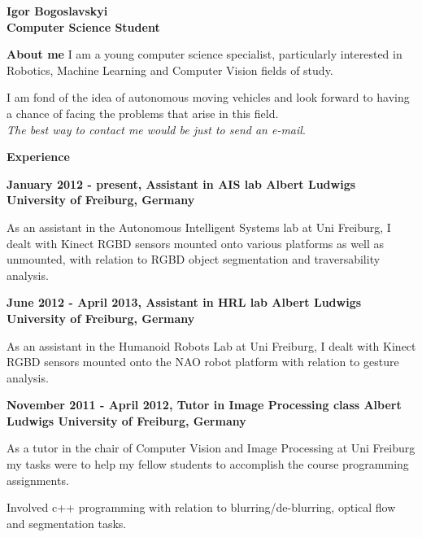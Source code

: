 \documentclass[a4paper,12pt,final]{memoir}
\newcommand{\Sep}{\vspace{1.5em}}
\newcommand{\SmallSep}{\vspace{0.5em}}
\newenvironment{AboutMe}
	{\ignorespaces\textbf{\color{Black} About me}}
	{\Sep\ignorespacesafterend}
\newcommand{\CVSection}[1]
	{\Large\textbf{#1}\par
	\SmallSep\normalsize\normalfont}
\newcommand{\CVItem}[1]
	{\textbf{\color{MidnightBlue} #1}}
\begin{document}
\Huge\bfseries {\color{MidnightBlue} Igor Bogoslavskyi} \\
\Large\bfseries  Computer Science Student \\

\normalsize\normalfont

\begin{AboutMe}
\newline 
I am a young computer science specialist, particularly interested in Robotics, Machine Learning and Computer Vision fields of study. 

I am fond of the idea of autonomous moving vehicles and look forward to having a chance of facing the problems that arise in this field. \\
\emph{The best way to contact me would be just to send an e-mail}.
\end{AboutMe}

\CVSection{Experience}
\CVItem{January 2012 - present, Assistant in AIS lab
\newline Albert Ludwigs University of Freiburg, Germany}
\begin{compactitem}[\color{RoyalBlue}$\circ$]
\item As an assistant in the Autonomous Intelligent Systems lab at Uni Freiburg, I dealt with Kinect RGBD sensors mounted onto various platforms as well as unmounted, with relation to RGBD object segmentation and traversability analysis. 
\end{compactitem}
\SmallSep

\CVItem{June 2012 - April 2013, Assistant in HRL lab
\newline Albert Ludwigs University of Freiburg, Germany}
\begin{compactitem}[\color{RoyalBlue}$\circ$]
	\item As an assistant in the Humanoid Robots Lab at Uni Freiburg, I dealt with Kinect RGBD sensors mounted onto the NAO robot platform with relation to gesture analysis. 
\end{compactitem}
\SmallSep

\CVItem{November 2011 - April 2012, Tutor in Image Processing class
\newline Albert Ludwigs University of Freiburg, Germany}
\begin{compactitem}[\color{RoyalBlue}$\circ$]
\item As a tutor in the chair of Computer Vision and Image Processing at Uni Freiburg my tasks were to help my fellow students to accomplish the course programming assignments. 
\item Involved c++ programming with relation to blurring/de-blurring, optical flow and segmentation tasks.
\end{compactitem}
\SmallSep
\end{document}
